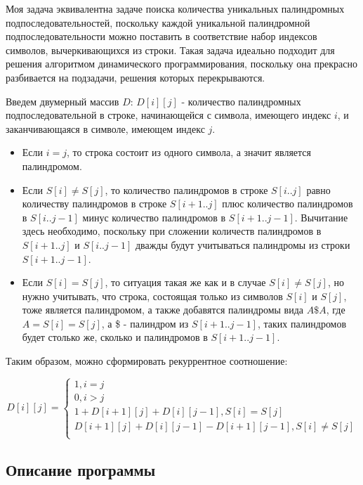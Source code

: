 \documentclass[12pt]{article}
\begin{document}
Моя задача эквивалентна задаче поиска количества уникальных палиндромных подпоследовательностей, поскольку каждой уникальной палиндромной подпоследовательности можно поставить в соответствие набор индексов символов, вычеркивающихся из строки. Такая задача идеально подходит для решения алгоритмом динамического программирования, поскольку она прекрасно разбивается на подзадачи, решения которых перекрываются. 

Введем двумерный массив $D$: $D[i][j]$ - количество палиндромных подпоследовательной в строке, начинающейся с символа, имеющего индекс $i$, и заканчивающаяся в символе, имеющем индекс $j$.

\begin{itemize}
    \item Если $i = j$, то строка состоит из одного символа, а значит является палиндромом.
    
    \item Если $S[i] \neq S[j]$, то количество палиндромов в строке $S[i..j]$ равно количеству палиндромов в строке $S[i + 1..j]$ плюс количество палиндромов в $S[i..j - 1]$ минус количество палиндромов в $S[i + 1..j - 1]$. Вычитание здесь необходимо, поскольку при сложении количеств палиндромов в $S[i + 1..j]$ и $S[i..j - 1]$ дважды будут учитываться палиндромы из строки $S[i + 1..j - 1]$. 
    
    \item Если $S[i] = S[j]$, то ситуация такая же как и в случае $S[i] \neq S[j]$, но нужно учитывать, что строка, состоящая только из символов $S[i]$ и $S[j]$, тоже является палиндромом, а также добавятся палиндромы вида $A\$A$, где $A = S[i] = S[j]$, а \$ - палиндром из $S[i + 1..j - 1]$, таких палиндромов будет столько же, сколько и палиндромов в $S[i + 1..j - 1]$.
\end{itemize}

Таким образом, можно сформировать рекуррентное соотношение:

$$
D[i][j] =
\left\{
  \begin{array}{cc}
     1, i = j \\
     0, i > j \\
     1 + D[i + 1][j] + D[i][j - 1] , S[i] = S[j] \\
     D[i + 1][j] + D[i][j - 1] - D[i + 1][j - 1], S[i] \neq S[j] \\
  \end{array}
\right.$$

\subsection*{Описание программы}
\end{document}
